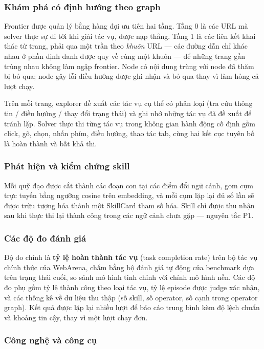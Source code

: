 \documentclass[14pt]{article}
\begin{document}
\subsubsection{Khám phá có định hướng theo graph}

Frontier được quản lý bằng hàng đợi ưu tiên hai tầng. Tầng 0 là các URL mà solver thực sự đi tới khi giải tác vụ, được nạp thẳng. Tầng 1 là các liên kết khai thác từ trang, phải qua một trần theo \textit{khuôn} URL --- các đường dẫn chỉ khác nhau ở phần định danh được quy về cùng một khuôn --- để những trang gần trùng nhau không làm ngập frontier. Node có nội dung trùng với node đã thăm bị bỏ qua; node gây lỗi điều hướng được ghi nhận và bỏ qua thay vì làm hỏng cả lượt chạy.

Trên mỗi trang, explorer đề xuất các tác vụ cụ thể có phân loại (tra cứu thông tin / điều hướng / thay đổi trạng thái) và ghi nhớ những tác vụ đã đề xuất để tránh lặp. Solver thực thi từng tác vụ trong không gian hành động cố định gồm click, gõ, chọn, nhấn phím, điều hướng, thao tác tab, cùng hai kết cục tuyên bố là hoàn thành và bất khả thi.

\subsubsection{Phát hiện và kiểm chứng skill}

Mỗi quỹ đạo được cắt thành các đoạn con tại các điểm đổi ngữ cảnh, gom cụm trực tuyến bằng ngưỡng cosine trên embedding, và mỗi cụm lặp lại đủ số lần sẽ được trừu tượng hóa thành một SkillCard tham số hóa. Skill chỉ được thu nhận sau khi thực thi lại thành công trong các ngữ cảnh chưa gặp --- nguyên tắc P1.

\subsubsection{Các độ đo đánh giá}

Độ đo chính là \textbf{tỷ lệ hoàn thành tác vụ} (task completion rate) trên bộ tác vụ chính thức của WebArena, chấm bằng bộ đánh giá tự động của benchmark dựa trên trạng thái cuối, so sánh mô hình tinh chỉnh với chính mô hình nền. Các độ đo phụ gồm tỷ lệ thành công theo loại tác vụ, tỷ lệ episode được judge xác nhận, và các thống kê về dữ liệu thu thập (số skill, số operator, số cạnh trong operator graph). Kết quả được lặp lại nhiều lượt để báo cáo trung bình kèm độ lệch chuẩn và khoảng tin cậy, thay vì một lượt chạy đơn.

\subsubsection{Công nghệ và công cụ}
\end{document}
